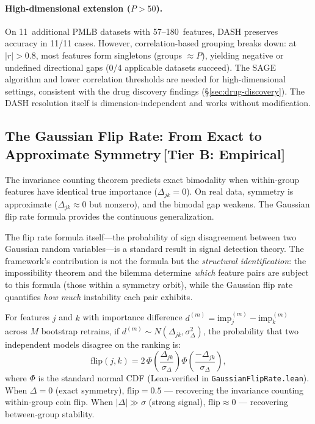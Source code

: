 \documentclass[11pt,a4paper]{article}
\begin{document}
\paragraph{High-dimensional extension ($P > 50$).}
On 11~additional PMLB datasets with 57--180~features, DASH preserves
accuracy in 11/11 cases.  However, correlation-based grouping breaks
down: at $|r| > 0.8$, most features form singletons (groups $\approx
P$), yielding negative or undefined directional gaps (0/4 applicable
datasets succeed).  The SAGE algorithm and lower correlation thresholds
are needed for high-dimensional settings, consistent with the drug
discovery findings (\S\ref{sec:drug-discovery}).  The DASH resolution
itself is dimension-independent and works without modification.

\subsection{The Gaussian Flip Rate: From Exact to Approximate Symmetry\,\textnormal{\normalsize[Tier B: Empirical]}}
\label{sec:gaussian-flip}

The invariance counting theorem predicts exact bimodality when within-group
features have identical true importance ($\Delta_{jk} = 0$).  On real data,
symmetry is approximate ($\Delta_{jk} \approx 0$ but nonzero), and the
bimodal gap weakens.  The Gaussian flip rate formula provides the continuous
generalization.

The flip rate formula itself---the probability of sign disagreement between two Gaussian random variables---is a standard result in signal detection theory. The framework's contribution is not the formula but the \emph{structural identification}: the impossibility theorem and the bilemma determine \emph{which} feature pairs are subject to this formula (those within a symmetry orbit), while the Gaussian flip rate quantifies \emph{how much} instability each pair exhibits.

For features $j$ and $k$ with importance difference
$d^{(m)} = \text{imp}_j^{(m)} - \text{imp}_k^{(m)}$ across $M$ bootstrap
retrains, if $d^{(m)} \sim N(\Delta_{jk}, \sigma^2_\Delta)$, the probability
that two independent models disagree on the ranking is:
\begin{equation}
  \text{flip}(j,k) = 2\,\Phi\!\left(\frac{\Delta_{jk}}{\sigma_\Delta}\right)
  \Phi\!\left(\frac{-\Delta_{jk}}{\sigma_\Delta}\right),
  \label{eq:gaussian-flip}
\end{equation}
where $\Phi$ is the standard normal CDF (Lean-verified in
\texttt{GaussianFlipRate.lean}).  When $\Delta = 0$ (exact symmetry),
$\text{flip} = 0.5$ --- recovering the invariance counting within-group coin flip.
When $|\Delta| \gg \sigma$ (strong signal), $\text{flip} \approx 0$ ---
recovering between-group stability.
\end{document}

